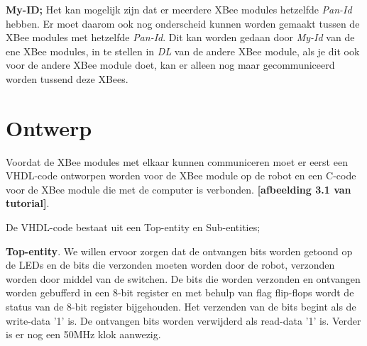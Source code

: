 \documentclass{report}
\begin{document}
\textbf{My-ID;}
\newline
Het kan mogelijk zijn dat er meerdere XBee modules hetzelfde\textit{ Pan-Id} hebben. Er moet daarom ook nog onderscheid kunnen worden gemaakt tussen de XBee modules met hetzelfde \textit{Pan-Id}. Dit kan worden gedaan door \textit{My-Id} van de ene XBee modules, in te stellen in \textit{DL} van de andere XBee module, als je dit ook voor de andere XBee module doet, kan er alleen nog maar gecommuniceerd worden tussend deze XBees.


\section{Ontwerp}
Voordat de XBee modules met elkaar kunnen communiceren moet er eerst een VHDL-code ontworpen worden voor de XBee module op de robot en een C-code voor de XBee module die met de computer is verbonden.
\textbf{[afbeelding 3.1 van tutorial]}.
\newline

De VHDL-code bestaat uit een Top-entity en Sub-entities;
\newline

\textbf{Top-entity}.
\newline
We willen ervoor zorgen dat de ontvangen bits worden getoond op de LEDs en de bits die verzonden moeten worden door de robot, verzonden worden door middel van de switchen. De bits die worden verzonden en ontvangen worden gebufferd in een 8-bit register en met behulp van flag flip-flops wordt de status van de 8-bit register bijgehouden. Het verzenden van de bits begint als de write-data '1' is. De ontvangen bits worden verwijderd als read-data '1' is. Verder is er nog een 50MHz klok aanwezig.
\newline
\end{document}

